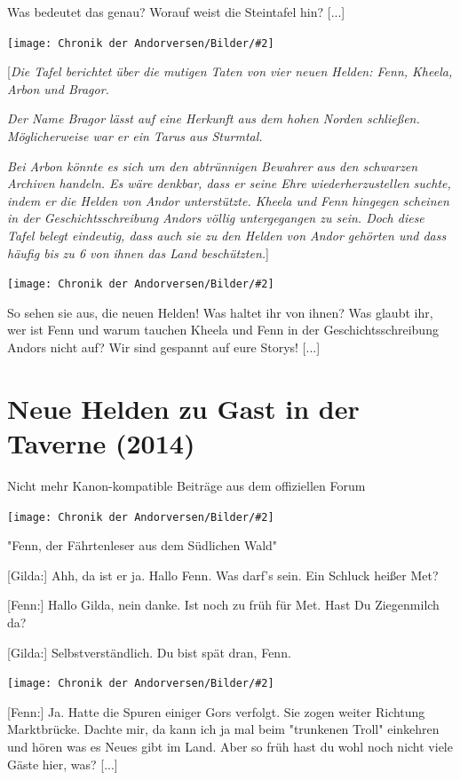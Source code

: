 \documentclass[10pt, a4paper, oneside]{book}
\newcommand{\storytext}[1]{%
    \section{#1}%
    \label{Storytext: #1}%
}
\newcommand{\bildmitts}[2][height=0.32\textwidth,width=0.48\textwidth,keepaspectratio]{%
    \begin{center}
        \texttt{[image: Chronik der Andorversen/Bilder/\#2]}
    \end{center}
}
\begin{document}
\begin{multicols}{2}
Was bedeutet das genau? Worauf weist die Steintafel hin? [...]

\bildmitts{Seltsame Tafel Bild 3.jpg}

[\textit{Die Tafel berichtet über die mutigen Taten von vier neuen Helden: Fenn, Kheela, Arbon und Bragor.}

\textit{Der Name Bragor lässt auf eine Herkunft aus dem hohen Norden schließen. Möglicherweise war er ein Tarus aus Sturmtal.}

\textit{Bei Arbon könnte es sich um den abtrünnigen Bewahrer aus den schwarzen Archiven handeln. Es wäre denkbar, dass er seine Ehre wiederherzustellen suchte, indem er die Helden von Andor unterstützte. Kheela und Fenn hingegen scheinen in der Geschichtsschreibung Andors völlig untergegangen zu sein. Doch diese Tafel belegt eindeutig, dass auch sie zu den Helden von Andor gehörten und dass häufig bis zu 6 von ihnen das Land beschützten.}]

\bildmitts{Seltsame Tafel Bild 4.jpg}

So sehen sie aus, die neuen Helden! Was haltet ihr von ihnen? Was glaubt ihr, wer ist Fenn und warum tauchen Kheela und Fenn in der Geschichtsschreibung Andors nicht auf? Wir sind gespannt auf eure Storys! [...]




\storytext{Neue Helden zu Gast in der Taverne (2014)}

\begin{center}
    Nicht mehr Kanon-kompatible Beiträge aus dem offiziellen Forum
\end{center}

\bildmitts{NH Taverne Fenn.jpg}

\begin{center}
    "Fenn, der Fährtenleser aus dem Südlichen Wald"
\end{center}


[Gilda:] Ahh, da ist er ja. Hallo Fenn. Was darf’s sein. Ein Schluck heißer Met?

[Fenn:] Hallo Gilda, nein danke. Ist noch zu früh für Met. Hast Du Ziegenmilch da?


[Gilda:] Selbstverständlich. Du bist spät dran, Fenn.

\bildmitts{NH Taverne Bild 1.jpg}

[Fenn:] Ja. Hatte die Spuren einiger Gors verfolgt. Sie zogen weiter Richtung Marktbrücke. Dachte mir, da kann ich ja mal beim "trunkenen Troll" einkehren und hören was es Neues gibt im Land. Aber so früh hast du wohl noch nicht viele Gäste hier, was? [...]


\end{multicols}
\end{document}
